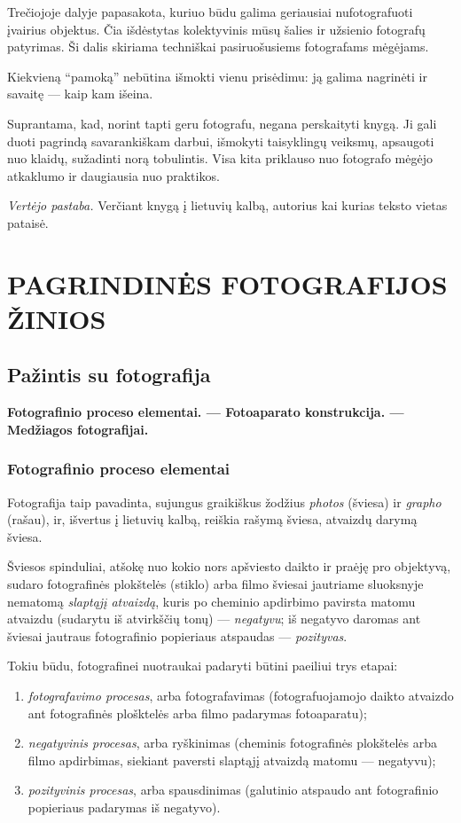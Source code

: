 \documentclass{book}
\begin{document}
		Trečiojoje dalyje papasakota, kuriuo būdu galima geriausiai nufotografuoti įvairius objektus. Čia išdėstytas kolektyvinis mūsų šalies ir užsienio fotografų patyrimas. Ši dalis skiriama techniškai pasiruošusiems fotografams mėgėjams.

		Kiekvieną ``pamoką'' nebūtina išmokti vienu prisėdimu: ją galima nagrinėti ir savaitę --- kaip kam išeina.

		Suprantama, kad, norint tapti geru fotografu, negana perskaityti knygą. Ji gali duoti pagrindą savarankiškam darbui, išmokyti taisyklingų veiksmų, apsaugoti nuo klaidų, sužadinti norą tobulintis. Visa kita priklauso nuo fotografo mėgėjo atkaklumo ir daugiausia nuo praktikos.

		\textit{Vertėjo pastaba.} Verčiant knygą į lietuvių kalbą, autorius kai kurias teksto vietas pataisė.
	\part{PAGRINDINĖS FOTOGRAFIJOS ŽINIOS}
	\setcounter{section}{0}
	\chapter{Pažintis su fotografija}
		\textbf{Fotografinio proceso elementai. --- Fotoaparato konstrukcija. --- Medžiagos fotografijai.}
		\section*{Fotografinio proceso elementai}
			Fotografija taip pavadinta, sujungus graikiškus žodžius \textit{photos} (šviesa) ir \textit{grapho} (rašau), ir, išvertus į lietuvių kalbą, reiškia rašymą šviesa, atvaizdų darymą šviesa.

			Šviesos spinduliai, atšokę nuo kokio nors apšviesto daikto ir praėję pro objektyvą, sudaro fotografinės plokštelės (stiklo) arba filmo šviesai jautriame sluoksnyje nematomą \textit{slaptąjį atvaizdą}, kuris po cheminio apdirbimo pavirsta matomu atvaizdu (sudarytu iš atvirkščių tonų) --- \textit{negatyvu}; iš negatyvo daromas ant šviesai jautraus fotografinio popieriaus atspaudas --- \textit{pozityvas}.

			Tokiu būdu, fotografinei nuotraukai padaryti būtini paeiliui trys etapai:
			\begin{enumerate}[1)]
				\item \textit{fotografavimo procesas}, arba fotografavimas (fotografuojamojo daikto atvaizdo ant fotografinės plošktelės arba filmo padarymas fotoaparatu);
				\item \textit{negatyvinis procesas}, arba ryškinimas (cheminis fotografinės plokštelės arba filmo apdirbimas, siekiant paversti slaptąjį atvaizdą matomu --- negatyvu);
				\item \textit{pozityvinis procesas}, arba spausdinimas (galutinio atspaudo ant fotografinio popieriaus padarymas iš negatyvo).
			\end{enumerate}
\end{document}
